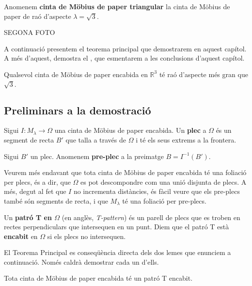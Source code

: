 \begin{ex}
    Anomenem \textbf{cinta de Möbius de paper triangular} la cinta de Möbius de paper de raó d'aspecte $\lambda = \sqrt{3}$.
\end{ex}
{\color{blue} SEGONA FOTO}

A continuació presentem el teorema principal que demostrarem en aquest capítol. A més d'aquest, \cite{schwartz2024} demostra el , que esmentarem a les conclusions d'aquest capítol. 
\begin{teo}\label{teo:Main Schwartz}
    Qualsevol cinta de Möbius de paper encabida en $\mathbb R^3$ té raó d'aspecte més gran que $\sqrt{3}$.
\end{teo}


\subsection{Preliminars a la demostració}
\begin{defi}
    Sigui $I:M_\lambda\to\Omega$ una cinta de Möbius de paper encabida. Un \textbf{plec} a $\Omega$ és un segment de recta $B'$ que talla a través de $\Omega$ i té els seus extrems a la frontera.
\end{defi}

\begin{defi}
    Sigui $B'$ un plec. Anomenem \textbf{pre-plec} a la preimatge $B=I^{-1}(B')$.
\end{defi}
Veurem més endavant que tota cinta de Möbius de paper encabida té una foliació per plecs, és a dir, que $\Omega$ es pot descompondre com una unió disjunta de plecs. A més, degut al fet que $I$ no incrementa distàncies, és fàcil veure que els pre-plecs també són segments de recta, i que $M_\lambda$ té una foliació per pre-plecs.
\begin{defi}
    Un \textbf{patró T en $\Omega$} (en anglès, \textit{T-pattern}) és un parell de plecs que es troben en rectes perpendiculars que intersequen en un punt. Diem que el patró T està \textbf{encabit} en $\Omega$ si els plecs no intersequen.
\end{defi}

El Teorema Principal es conseqüència directa dels dos lemes que enunciem a continuació. Només caldrà demostrar cada un d'ells.
\begin{lema}[\textbf{T}]\label{lema T}
    Tota cinta de Möbius de paper encabida té un patró T encabit.
\end{lema}

